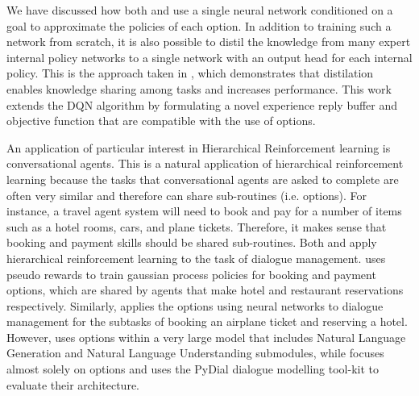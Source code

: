 We have discussed how both \cite{Florensa} and \cite{Tejas}
use a single neural network conditioned on a goal to approximate the policies of each option.
In addition to training such a network from scratch, it is also possible to distil
the knowledge from many expert internal policy networks to a single network with an
output head for each internal policy. This is the approach taken in \cite{Tessler}, which
demonstrates that distilation enables knowledge sharing among tasks and increases performance.
This work extends the DQN algorithm by formulating a novel
experience reply buffer and objective function that are compatible with the use
of options.

An application of particular interest in Hierarchical Reinforcement learning
is conversational agents. This is a natural application of hierarchical
reinforcement learning because the tasks that conversational agents are asked
to complete are often very similar and therefore can share sub-routines
(i.e. options). For instance, a travel agent system will need to book
and pay for a number of items such as a hotel rooms, cars, and plane tickets.
Therefore, it makes sense that booking and payment skills should be shared sub-routines.
Both \cite{Peng} and \cite{Budzianowski} apply hierarchical
reinforcement learning to the task of dialogue management. \cite{Budzianowski}
uses pseudo rewards to train gaussian process policies for booking and payment options,
which are shared by agents that make hotel and restaurant reservations respectively.
Similarly, \cite{Peng} applies the options using neural networks
to dialogue management for the subtasks of booking an airplane ticket and reserving a hotel.
However, \cite{Peng} uses options within a very large model that
includes Natural Language Generation and Natural Language Understanding
submodules, while \cite{Budzianowski} focuses almost solely on options and
uses the PyDial dialogue modelling tool-kit to evaluate their architecture.


